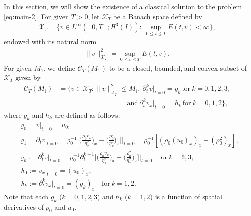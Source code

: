 \documentclass[11pt, reqno]{amsart}
\numberwithin{equation}{section}
\begin{document}
{In this section, we will show the existence of a classical solution to the problem \eqref{eq:main-2}. For given \(T>0\), let \(\mathcal{X}_T\) be a Banach space defined by
\begin{equation*}
	\begin{aligned}
		\mathcal{X}_T=\{ v\in L^\infty([0,T]; H^3(I)):\ \sup_{0\leq t\leq T}E(t,v)<\infty\},
	\end{aligned}
\end{equation*}
endowed with its natural norm
\begin{equation*}
	\begin{aligned}
		\|v\|_{\mathcal{X}_T}^2=\sup_{0\leq t\leq T}E(t,v).
	\end{aligned}
\end{equation*}
For given \(M_1\), we define \(\mathcal{C}_T(M_1)\) to be a closed, bounded, and
convex subset of \(\mathcal{X}_T\) given by
\begin{equation}\label{solution space}
	\begin{aligned}
		\mathcal{C}_T(M_1)&=\{ v\in \mathcal{X}_T:\|v\|_{\mathcal{X}_T}^2\leq M_1
		,\ \partial_t^kv|_{t=0}=g_k
		\ \mbox{for}\  k=0,1,2,3,\\ 
          &\quad\quad\quad\quad\quad\quad\quad\quad\quad\quad  \mbox{and}\  \partial_t^kv_x|_{t=0}=h_k\ \mbox{for}\  k=0,1,2\},
	\end{aligned}
\end{equation}
where \(g_k\) and \(h_k\) are defined as follows:
\begin{equation*}
	\begin{aligned}
		&g_0=v|_{t=0}=u_0,\\
		&g_1=\partial_tv|_{t=0}=\rho_0^{-1}\bigg[\bigg(\frac{\rho_0v_x}{\eta_x^2}\bigg)_x
		-\bigg({\frac{\rho_0^2}{\eta_x^2}}\bigg)_x\bigg]\bigg|_{t=0}
		=\rho_0^{-1}[(\rho_0(u_0)_x)_x-(\rho_0^2)_x],\\
	&g_k:=\partial_t^kv|_{t=0}=\rho_0^{-1}\partial_t^{k-1}\bigg[\bigg(\frac{\rho_0v_x}{\eta_x^2}\bigg)_x
	-\bigg({\frac{\rho_0^2}{\eta_x^2}}\bigg)_x\bigg]\bigg|_{t=0}\quad \text{for}\ k=2,3,\\
&h_0:=v_x|_{t=0}=(u_0)_x,\\
& h_k:=\partial_t^kv_x|_{t=0}=(g_k)_x\quad \text{for}\  k=1,2.
	\end{aligned}
\end{equation*}
Note that each \(g_k\) (\(k=0,1,2,3\)) and \(h_k\) (\(k=1,2\)) is a function of spatial derivatives of \(\rho_0\) and \(u_0\).


}
\end{document}
